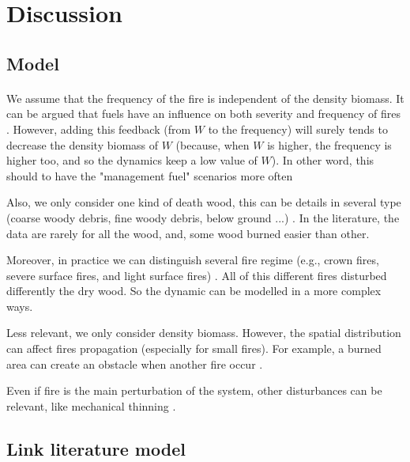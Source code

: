 \documentclass{article}
\begin{document}
\section{Discussion}



\subsection{Model}


\paragraph{}
We assume that the frequency of the fire is independent of the density biomass. It can be argued that fuels have an influence on both severity and frequency  of fires \cite{schoennagel_interaction_2004}. However, adding this feedback (from $W$ to the frequency) will surely tends to decrease the density biomass of $W$ (because, when $W$ is higher, the frequency is higher too, and so the dynamics keep a low value of $W$). In other word, this should to have the "management fuel" scenarios more often

Also, we only consider one kind of death wood, this can be details in several type (coarse woody debris, fine woody debris, below ground ...) \cite{russell_quantifying_2015}. In the literature, the data are rarely for all the wood, and, some wood burned easier than other. 

Moreover, in practice we can distinguish several fire regime (e.g., crown fires, severe surface fires, and light surface fires) \cite{reichle_fire_1981}. All of this different fires disturbed differently the dry wood. So the dynamic can be modelled in a more complex ways.

Less relevant, we only consider density biomass. However, the spatial distribution can affect fires propagation (especially for small fires). For example, a burned area can create an obstacle when another fire occur \cite{bergeron_natural_2002}.

Even if fire is the main perturbation of the system, other disturbances can be relevant, like mechanical thinning \cite{liu_analyzing_2010}\cite{schoennagel_interaction_2004}\cite{wimberly_assessing_2009}.


\subsection{Link literature model}
\end{document}
